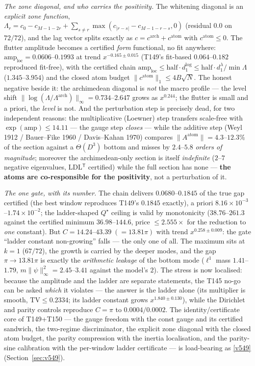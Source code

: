 \documentclass[11pt,a4paper]{article}
\begin{document}
\emph{The zone diagonal, and who carries the positivity.} The whitening diagonal is an
\emph{explicit zone function},
$\Lambda_r=c_0-c_{M-1-2r}+\sum_{s\ne r}\max(c_{|r-s|}-c_{M-1-r-s},0)$ (residual $0.0$ on
$72/72$), and the lag vector splits exactly as $c=c^{\mathrm{arch}}+c^{\mathrm{atom}}$ with
$c^{\mathrm{atom}}\le0$. The flutter amplitude becomes a certified \emph{form} functional,
no fit anywhere: $\mathrm{amp}_{\mathrm{loc}}=0.0606$--$0.1993$ at trend $x^{-0.165\pm0.015}$
(T149's fit-based $0.064$--$0.182$ reproduced fit-free), with the certified chain
$\mathrm{amp}_{\mathrm{loc}}\le\mathrm{half}\cdot d_1^{\log}\le
\mathrm{half}\cdot d_1^\lambda/\min\Lambda$ ($1.345$--$3.954$) and the closed atom budget
$\|c^{\mathrm{atom}}\|_1\le4B\sqrt N$. The honest negative beside it: the archimedean
diagonal is \emph{not} the macro profile --- the level shift
$\|\log(\Lambda/\Lambda^{\mathrm{arch}})\|_\infty=0.734$--$2.647$ grows as $x^{0.244}$;
the flutter is small and a priori, the \emph{level} is not. And the perturbation step is
precisely dead, for two independent reasons: the multiplicative (Loewner) step transfers
scale-free with $\exp(\mathrm{amp})\le14.11$ --- the gauge step \emph{closes} --- while the
additive step (Weyl 1912 / Bauer--Fike 1960 / Davis--Kahan 1970) compares
$\|A^{\mathrm{atom}}\|=4.3$--$12.3\%$ of the section against a $\Theta(D^3)$ bottom and
misses by $2.4$--$5.8$ \emph{orders of magnitude}; moreover the archimedean-only section is
itself \emph{indefinite} ($2$--$7$ negative eigenvalues, LDL$^{\mathsf T}$ certified) while
the full section has none --- \textbf{the atoms are co-responsible for the positivity}, not a
perturbation of it.

\emph{The one gate, with its number.} The chain delivers $0.0680$--$0.1845$ of the true gap
certified (the best window reproduces T149's $0.1845$ exactly), a priori
$8.16\times10^{-3}$--$1.74\times10^{-2}$; the ladder-shaped $Q^\star$ ceiling is valid by
monotonicity ($38.76$--$261.3$ against the certified minimum $36.98$--$144.6$, price
$\le2.555\times$ for the reduction to \emph{one} constant). But
$C=14.24$--$43.39\;(=13.81\pi)$ with trend $x^{0.258\pm0.009}$: the gate ``ladder constant
non-growing'' falls --- the only one of all. The maximum sits at $k=1$ ($67/72$), the growth is
carried by the deeper modes, and the gap $\pi\to13.81\pi$ is exactly the \emph{arithmetic
leakage} of the bottom mode ($\ell^1$ mass $1.41$--$1.79$,
$m\|\psi\|_\infty^2=2.45$--$3.41$ against the model's $2$). The stress is now localised:
because the amplitude and the ladder are separate statements, the T145 no-go can be asked
\emph{which} it violates --- the answer is the ladder alone (its multiplier is smooth,
$\mathrm{TV}\le0.2334$; its ladder constant grows $x^{1.840\pm0.130}$), while the Dirichlet
and parity controls reproduce $C=\pi$ to $0.0004/0.0002$. The identity/certificate core of
T149+T150 --- the gauge freedom with the const gauge and its certified sandwich, the two-regime
discriminator, the explicit zone diagonal with the closed atom budget, the parity compression
with the inertia localisation, and the parity-sine calibration with the per-window ladder
certificate --- is load-bearing as \vref{v549} 
(Section~\ref{sec:v549}).
\end{document}
